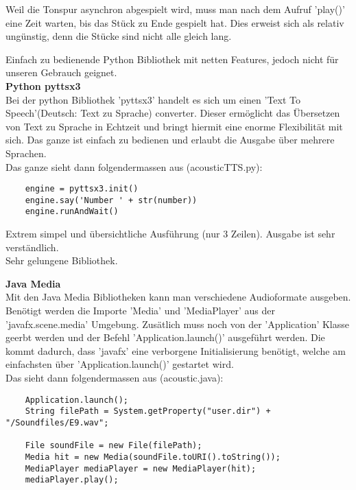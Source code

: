 \documentclass[../../main.tex]{subfiles}
\begin{document}
    Weil die Tonspur asynchron abgespielt wird, muss man nach dem Aufruf 'play()' eine Zeit warten, bis das Stück zu Ende gespielt hat.
    Dies erweist sich als relativ ungünstig, denn die Stücke sind nicht alle gleich lang.

    Einfach zu bedienende Python Bibliothek mit netten Features, jedoch nicht für unseren Gebrauch geignet.\\

    \textbf{Python pyttsx3}\\
    Bei der python Bibliothek 'pyttsx3' handelt es sich um einen 'Text To Speech'(Deutsch: Text zu Sprache) converter.
    Dieser ermöglicht das Übersetzen von Text zu Sprache in Echtzeit und bringt hiermit eine enorme Flexibilität mit sich.
    Das ganze ist einfach zu bedienen und erlaubt die Ausgabe über mehrere Sprachen.\\

    Das ganze sieht dann folgendermassen aus (acousticTTS.py):
    \begin{lstlisting}
    engine = pyttsx3.init()
    engine.say('Number ' + str(number))
    engine.runAndWait()
    \end{lstlisting}

    Extrem simpel und übersichtliche Ausführung (nur 3 Zeilen). Ausgabe ist sehr verständlich.\\
    Sehr gelungene Bibliothek.

    \textbf{Java Media}\\
    Mit den Java Media Bibliotheken kann man verschiedene Audioformate ausgeben.
    Benötigt werden die Importe 'Media' und 'MediaPlayer' aus der 'javafx.scene.media' Umgebung.
    Zusätlich muss noch von der 'Application' Klasse geerbt werden und der Befehl 'Application.launch()' ausgeführt werden.
    Die kommt dadurch, dass 'javafx' eine verborgene Initialisierung benötigt,
    welche am einfachsten über 'Application.launch()' gestartet wird.\\

    Das sieht dann folgendermassen aus (acoustic.java):
    \begin{lstlisting}
    Application.launch();
    String filePath = System.getProperty("user.dir") + "/Soundfiles/E9.wav";

    File soundFile = new File(filePath);
    Media hit = new Media(soundFile.toURI().toString());
    MediaPlayer mediaPlayer = new MediaPlayer(hit);
    mediaPlayer.play();
    \end{lstlisting}
\end{document}
